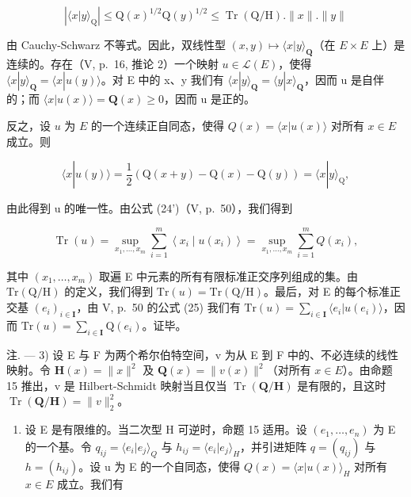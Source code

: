 \[
\left| \langle x | y \rangle_ {\mathrm{Q}} \right| \leqslant \mathrm{Q} (x) ^ {1 / 2} \mathrm{Q} (y) ^ {1 / 2} \leqslant \operatorname{Tr} (\mathrm{Q} / \mathrm{H}). \| x \|. \| y \|
\]

由 Cauchy-Schwarz 不等式。因此，双线性型 \((x,y)\mapsto\langle x|y\rangle_{\mathbf{Q}}\)（在 \(E\times E\) 上）是连续的。存在（V, p.~16, 推论 2）一个映射 \(u\in\mathcal{L}(E)\)，使得 \(\langle x|y\rangle_{\mathbf{Q}}=\langle x|u(y)\rangle\)。对 E 中的 x、y 我们有 \(\langle x|y\rangle_{\mathbf{Q}}=\langle y|x\rangle_{\mathbf{Q}}\)，因而 u 是自伴的；而 \(\langle x|u(x)\rangle=\mathbf{Q}(x)\geqslant0\)，因而 u 是正的。

反之，设 \(u\) 为 \(E\) 的一个连续正自同态，使得 \(Q(x) = \langle x|u(x) \rangle\) 对所有 \(x \in E\) 成立。则

\[
\langle x | u (y) \rangle = \frac {1}{2} (\mathrm{Q} (x + y) - \mathrm{Q} (x) - \mathrm{Q} (y)) = \langle x | y \rangle_ {\mathrm{Q}},
\]

由此得到 u 的唯一性。由公式 (24')（V, p.~50），我们得到

\[
\operatorname{Tr} (u) = \sup _ {x _ {1}, \dots , x _ {m}} \sum_ {i = 1} ^ {m} \left\langle x _ {i} \mid u \left(x _ {i}\right) \right\rangle = \sup _ {x _ {1}, \dots , x _ {m}} \sum_ {i = 1} ^ {m} Q \left(x _ {i}\right),
\]

其中 \((x_{1},\ldots ,x_{m})\) 取遍 E 中元素的所有有限标准正交序列组成的集。由 \(\mathrm{Tr}(\mathrm{Q / H})\) 的定义，我们得到 \(\mathrm{Tr}(u) = \mathrm{Tr}(\mathrm{Q / H})\)。最后，对 E 的每个标准正交基 \((e_i)_{i\in \mathbf{I}}\)，由 V, p.~50 的公式 (25) 我们有 \(\mathrm{Tr}(u) = \sum_{i\in \mathbf{I}}\langle e_i|u(e_i)\rangle\)，因而 \(\mathrm{Tr}(u) = \sum_{i\in \mathbf{I}}\mathrm{Q}(e_i)\)。证毕。

注. --- 3) 设 E 与 F 为两个希尔伯特空间，v 为从 E 到 F 中的、不必连续的线性映射。令 \(\mathbf{H}(x)=\|x\|^{2}\) 及 \(\mathbf{Q}(x)=\|v(x)\|^{2}\)（对所有 \(x\in E\)）。由命题 15 推出，v 是 Hilbert-Schmidt 映射当且仅当 \(\operatorname{Tr}(\mathbf{Q}/\mathbf{H})\) 是有限的，且这时 \(\operatorname{Tr}(\mathbf{Q}/\mathbf{H})=\|v\|_{2}^{2}\)。

\begin{enumerate}
\def\labelenumi{\arabic{enumi})}
\setcounter{enumi}{3}
\tightlist
\item
  设 E 是有限维的。当二次型 H 可逆时，命题 15 适用。设 \((e_{1}, \ldots, e_{n})\) 为 E 的一个基。令 \(q_{ij} = \langle e_{i}|e_{j} \rangle_{Q}\) 与 \(h_{ij} = \langle e_{i}|e_{j} \rangle_{H}\)，并引进矩阵 \(q = (q_{ij})\) 与 \(h = (h_{ij})\)。设 u 为 E 的一个自同态，使得 \(Q(x) = \langle x|u(x) \rangle_{H}\) 对所有 \(x \in E\) 成立。我们有
\end{enumerate}


